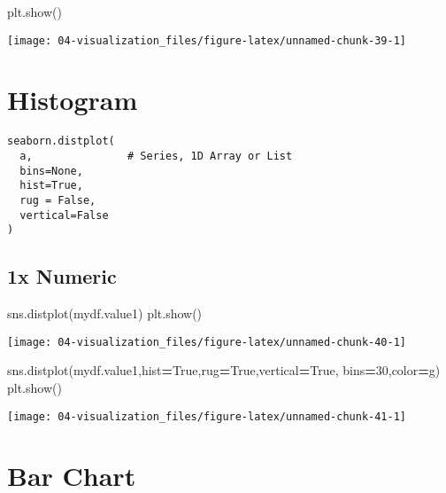 \documentclass[
]{book}
\newenvironment{Shaded}{\begin{snugshade}}{\end{snugshade}}
\newcommand{\DecValTok}[1]{\textcolor[rgb]{0.06,0.06,0.06}{#1}}
\newcommand{\NormalTok}[1]{#1}
\newcommand{\OperatorTok}[1]{\textcolor[rgb]{0.43,0.43,0.43}{\textbf{#1}}}
\newcommand{\StringTok}[1]{\textcolor[rgb]{0.5,0.5,0.5}{#1}}
\newcommand{\VariableTok}[1]{\textcolor[rgb]{0,0,0}{#1}}
\begin{document}
\begin{Shaded}
\begin{Highlighting}[]
\NormalTok{plt.show()}
\end{Highlighting}
\end{Shaded}

\texttt{[image: 04-visualization\_files/figure-latex/unnamed-chunk-39-1]}

\hypertarget{histogram-1}{%
\section{Histogram}\label{histogram-1}}

\begin{verbatim}
seaborn.distplot(
  a,               # Series, 1D Array or List
  bins=None,
  hist=True,
  rug = False,
  vertical=False
)
\end{verbatim}

\hypertarget{x-numeric-1}{%
\subsection{1x Numeric}\label{x-numeric-1}}

\begin{Shaded}
\begin{Highlighting}[]
\NormalTok{sns.distplot(mydf.value1)}
\NormalTok{plt.show()}
\end{Highlighting}
\end{Shaded}

\texttt{[image: 04-visualization\_files/figure-latex/unnamed-chunk-40-1]}

\begin{Shaded}
\begin{Highlighting}[]
\NormalTok{sns.distplot(mydf.value1,hist}\OperatorTok{=}\VariableTok{True}\NormalTok{,rug}\OperatorTok{=}\VariableTok{True}\NormalTok{,vertical}\OperatorTok{=}\VariableTok{True}\NormalTok{, bins}\OperatorTok{=}\DecValTok{30}\NormalTok{,color}\OperatorTok{=}\StringTok{\textquotesingle{}g\textquotesingle{}}\NormalTok{)}
\NormalTok{plt.show()}
\end{Highlighting}
\end{Shaded}

\texttt{[image: 04-visualization\_files/figure-latex/unnamed-chunk-41-1]}

\hypertarget{bar-chart-1}{%
\section{Bar Chart}\label{bar-chart-1}}
\end{document}
